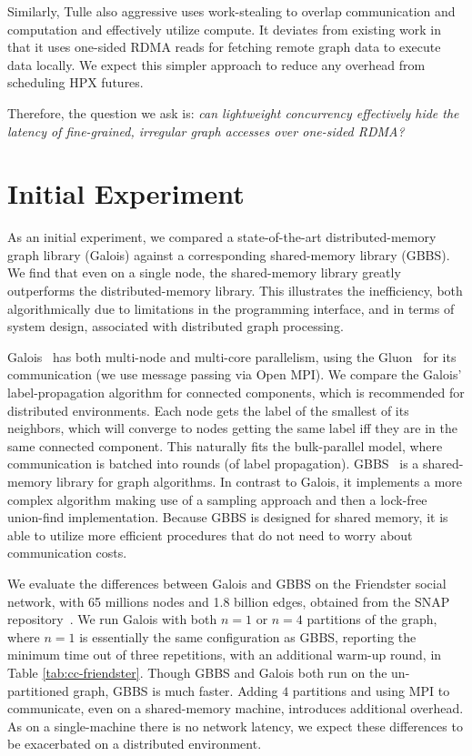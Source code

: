 \documentclass{article}
\begin{document}
Similarly, Tulle also aggressive uses work-stealing to overlap communication and computation and effectively utilize compute.
It deviates from existing work in that it uses one-sided RDMA reads for fetching remote graph data to execute data locally.
We expect this simpler approach to reduce any overhead from scheduling HPX futures.

Therefore, the question we ask is: \emph{can lightweight concurrency effectively hide the latency of fine-grained, irregular graph accesses over one-sided RDMA?}

\section{Initial Experiment}

As an initial experiment, we compared a state-of-the-art distributed-memory graph library (Galois) against a corresponding shared-memory library (GBBS).
We find that even on a single node, the shared-memory library greatly outperforms the distributed-memory library.
This illustrates the inefficiency, both algorithmically due to limitations in the programming interface, and in terms of system design, associated with distributed graph processing.

Galois~\cite{nguyen2013lightweight} has both multi-node and multi-core parallelism, using the Gluon~\cite{dathathri2018gluon} for its communication (we use message passing via Open MPI).
We compare the Galois' label-propagation algorithm for connected components, which is recommended for distributed environments.
Each node gets the label of the smallest of its neighbors, which will converge to nodes getting the same label iff they are in the same connected component.
This naturally fits the bulk-parallel model, where communication is batched into rounds (of label propagation).
GBBS~\cite{dhulipala2021theoretically} is a shared-memory library for graph algorithms.
In contrast to Galois, it implements a more complex algorithm making use of a sampling approach and then a lock-free union-find implementation.
Because GBBS is designed for shared memory, it is able to utilize more efficient procedures that do not need to worry about communication costs.

We evaluate the differences between Galois and GBBS on the Friendster social network, with 65 millions nodes and 1.8 billion edges, obtained from the SNAP repository~\cite{leskovec2014snap}.
We run Galois with both $n=1$ or $n=4$ partitions of the graph, where $n=1$ is essentially the same configuration as GBBS, reporting the minimum time out of three repetitions, with an additional warm-up round, in Table \ref{tab:cc-friendster}.
Though GBBS and Galois both run on the un-partitioned graph, GBBS is much faster.
Adding $4$ partitions and using MPI to communicate, even on a shared-memory machine, introduces additional overhead.
As on a single-machine there is no network latency, we expect these differences to be exacerbated on a distributed environment.
\end{document}

